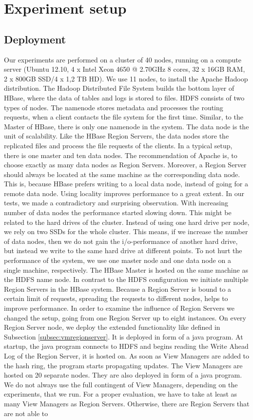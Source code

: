 \documentclass[11pt,a4paper,bibtotoc,idxtotoc,headsepline,footsepline,footexclude,BCOR12mm,DIV13]{scrbook}
\begin{document}
\section{Experiment setup}
\subsection{Deployment}
Our experiments are performed on a cluster of 40 nodes, running on a compute server (Ubuntu 12.10, 4 x Intel Xeon 4650 @ 2.70GHz 8 cores, 32 x 16GB RAM, 2 x 800GB SSD/4 x 1,2 TB HD). We use 11 nodes, to install the Apache Hadoop distribution. The Hadoop Distributed File System builds the bottom layer of HBase, where the data of tables and logs is stored to files. HDFS consists of two types of nodes. The namenode stores metadata and processes the routing requests, when a client contacts the file system for the first time. Similar, to the Master of HBase, there is only one namenode in the system. The data node is the unit of scalability. Like the HBase Region Servers, the data nodes store the replicated files and process the file requests of the clients. In a typical setup, there is one master and ten data nodes. The recommendation of Apache is, to choose exactly as many data nodes as Region Servers. Moreover, a Region Server should always be located at the same machine as the corresponding data node. This is, because HBase prefers writing to a local data node, instead of going for a remote data node. Using locality improves performance to a great extent. In our tests, we made a contradictory and surprising observation. With increasing number of data nodes the performance started slowing down. This might be related to the hard drives of the cluster. Instead of using one hard drive per node, we rely on two SSDs for the whole cluster. This means, if we increase the number of data nodes, then we do not gain the i/o-performance of another hard drive, but instead we write to the same hard drive at different points. To not hurt the performance of the system, we use one master node and one data node on a single machine, respectively. The HBase Master is hosted on the same machine as the HDFS name node. In contrast to the HDFS configuration we initiate multiple Region Servers in the HBase system. Because a Region Server is bound to a certain limit of requests, spreading the requests to different nodes, helps to improve performance. In order to examine the influence of Region Servers we changed the setup, going from one Region Server up to eight instances. On every Region Server node, we deploy the extended functionality like defined in Subsection \ref{subsec:vmregionserver}. It is deployed in form of a java program. At startup, the java program connects to HDFS and begins reading the Write Ahead Log of the Region Server, it is hosted on. As soon as View Managers are added to the hash ring, the program starts propagating updates.  The View Managers are hosted on 20 separate nodes. They are also deployed in form of a java program. We do not always use the full contingent of View Managers, depending on the experiments, that we run. For a proper evaluation, we have to take at least as many View Managers as Region Servers. Otherwise, there are Region Servers that are not able to 
\end{document}

